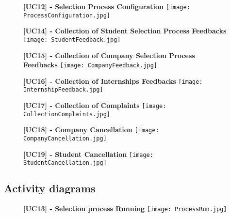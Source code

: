 			\begin{figure}[H]
				\centering
				{\bfseries [UC12] - Selection Process Configuration}
				\texttt{[image: ProcessConfiguration.jpg]}
				
			\end{figure}
			
			\begin{figure}[H]
				\centering
				{\bfseries [UC14] - Collection of Student Selection Process Feedbacks}
				\texttt{[image: StudentFeedback.jpg]}
				
			\end{figure}
			
			\begin{figure}[H]
				\centering
				{\bfseries [UC15] - Collection of Company Selection Process Feedbacks}
				\texttt{[image: CompanyFeedback.jpg]}
				
			\end{figure}
			
			\begin{figure}[H]
				\centering
				{\bfseries [UC16] - Collection of Internships Feedbacks}
				\texttt{[image: InternshipFeedback.jpg]}
				
			\end{figure}
			
			
			\begin{figure}[H]
				\centering
				{\bfseries [UC17] - Collection of Complaints}
				\texttt{[image: CollectionComplaints.jpg]}
				
			\end{figure}
			
			\begin{figure}[H]
				\centering
				{\bfseries [UC18] - Company Cancellation}
				\texttt{[image: CompanyCancellation.jpg]}
				
			\end{figure}
			
			\begin{figure}[H]
				\centering
				{\bfseries [UC19] - Student Cancellation}
				\texttt{[image: StudentCancellation.jpg]}
				
			\end{figure}
		\subsection{Activity diagrams}
		
			\begin{figure}[H]
				\centering
				{\bfseries [UC13] - Selection process Running}
				\texttt{[image: ProcessRun.jpg]}
				
			\end{figure}
			

